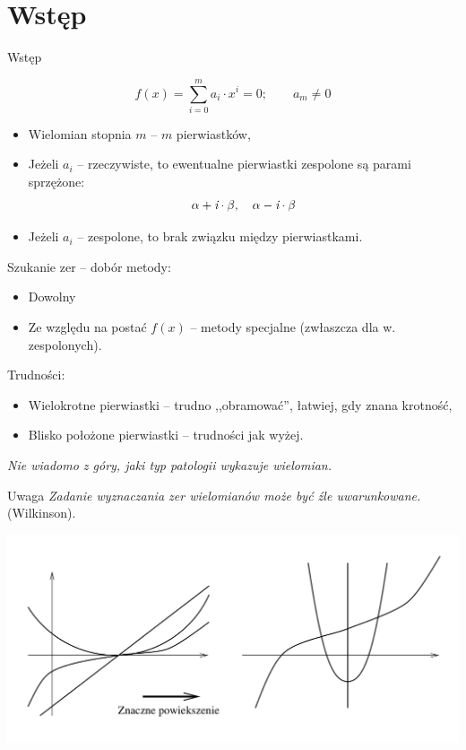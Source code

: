 \section{Wstęp}

\begin{frame}{Wstęp}
  \begin{block}{}
    $$ f(x) = \sum_{i=0}^m a_i \cdot x^i = 0; \qquad a_m \neq 0 $$
  \end{block}

  \begin{itemize}
    \item Wielomian stopnia $m$ -- $m$ pierwiastków,
    \item Jeżeli $a_i$ -- rzeczywiste, to ewentualne pierwiastki zespolone są parami sprzężone:
    $$ \alpha + \textit{\textrm{i}} \cdot \beta, \quad \alpha - \textit{\textrm{i}} \cdot \beta $$
    \item Jeżeli $a_i$ -- zespolone, to brak związku między pierwiastkami.
  \end{itemize}
\end{frame}

\begin{frame}
  Szukanie zer -- dobór metody:
  \begin{itemize}
    \item Dowolny
    \item Ze względu na postać $f(x)$ -- metody specjalne (zwłaszcza dla w. zespolonych).
  \end{itemize}

  Trudności:
  \begin{itemize}
    \item Wielokrotne pierwiastki -- trudno ,,obramować'', łatwiej, gdy znana krotność,
    \item Blisko położone pierwiastki -- trudności jak wyżej.
  \end{itemize}

  \textit{Nie wiadomo z góry, jaki typ patologii wykazuje wielomian.}

  \vspace{5px}

  \begin{alertblock}{Uwaga}
      \textit{Zadanie wyznaczania zer wielomianów może być źle uwarunkowane.} (Wilkinson).
  \end{alertblock}
\end{frame}

\begin{frame}
  \includegraphics[width=\textwidth]{img/8/wielomian}
\end{frame}
